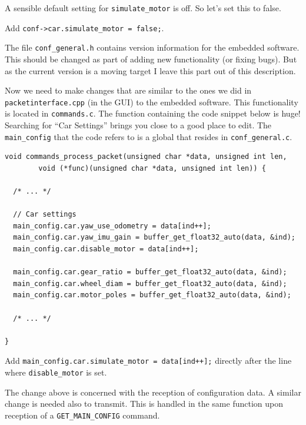 \documentclass[12pt]{article} %
\newcommand{\change}[0]{\noindent{\hl {\b CODE CHANGE:}}}
\begin{document}
A sensible default setting for {\verb!simulate_motor!} is off. So let's set this
to false.

\change{} Add {\verb!conf->car.simulate_motor = false;!}. 

The file {\verb!conf_general.h!} contains version information for the embedded software.
This should be changed as part of adding new functionality (or fixing bugs). But as the current
version is a moving target I leave this part out of this description.


Now we need to make changes that are similar to the ones we did in
{\verb!packetinterface.cpp!} (in the GUI) to the embedded
software. This functionality is located in {\verb!commands.c!}.  The
function containing the code snippet below is huge! Searching for
``Car Settings'' brings you close to a good place to edit. The {\verb!main_config!}
that the code refers to is a global that resides in {\verb!conf_general.c!}.

\begin{Verbatim}[samepage=true,frame=single,label=Embedded/RC\_Controller/commands.c]
void commands_process_packet(unsigned char *data, unsigned int len,
		void (*func)(unsigned char *data, unsigned int len)) {

  /* ... */
                  
  // Car settings
  main_config.car.yaw_use_odometry = data[ind++];
  main_config.car.yaw_imu_gain = buffer_get_float32_auto(data, &ind);
  main_config.car.disable_motor = data[ind++];

  main_config.car.gear_ratio = buffer_get_float32_auto(data, &ind);
  main_config.car.wheel_diam = buffer_get_float32_auto(data, &ind);
  main_config.car.motor_poles = buffer_get_float32_auto(data, &ind);
  
  /* ... */
  
}
\end{Verbatim}

\change{} Add {\verb!main_config.car.simulate_motor = data[ind++];!} directly after the
line where {\verb!disable_motor!} is set.

The change above is concerned with the reception of configuration
data. A similar change is needed also to transmit. This is handled in the same function
upon reception of a {\verb!GET_MAIN_CONFIG!} command. 
\end{document}
